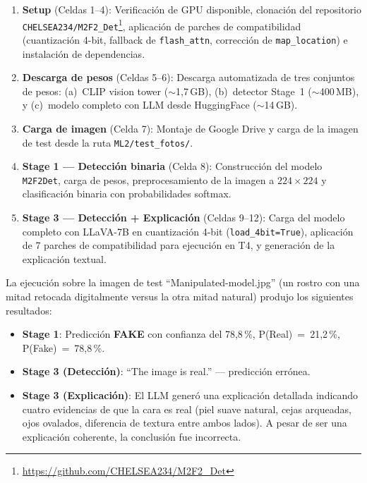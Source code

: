 \documentclass[pdflatex,sn-mathphys-num]{sn-jnl}
\begin{document}
\begin{enumerate}
    \item \textbf{Setup} (Celdas 1--4): Verificación de GPU disponible, clonación del repositorio \texttt{CHELSEA234/M2F2\_Det}\footnote{\url{https://github.com/CHELSEA234/M2F2_Det}}, aplicación de parches de compatibilidad (cuantización 4-bit, fallback de \texttt{flash\_attn}, corrección de \texttt{map\_location}) e instalación de dependencias.

    \item \textbf{Descarga de pesos} (Celdas 5--6): Descarga automatizada de tres conjuntos de pesos: (a)~CLIP vision tower ($\sim$1,7\,GB), (b)~detector Stage~1 ($\sim$400\,MB), y (c)~modelo completo con LLM desde HuggingFace ($\sim$14\,GB).

    \item \textbf{Carga de imagen} (Celda 7): Montaje de Google Drive y carga de la imagen de test desde la ruta \texttt{ML2/test\_fotos/}.

    \item \textbf{Stage 1 --- Detección binaria} (Celda 8): Construcción del modelo \texttt{M2F2Det}, carga de pesos, preprocesamiento de la imagen a $224\times224$ y clasificación binaria con probabilidades softmax.

    \item \textbf{Stage 3 --- Detección + Explicación} (Celdas 9--12): Carga del modelo completo con LLaVA-7B en cuantización 4-bit (\texttt{load\_4bit=True}), aplicación de 7 parches de compatibilidad para ejecución en T4, y generación de la explicación textual.
\end{enumerate}

La ejecución sobre la imagen de test ``Manipulated-model.jpg'' (un rostro con una mitad retocada digitalmente versus la otra mitad natural) produjo los siguientes resultados:
\begin{itemize}
    \item \textbf{Stage 1}: Predicción \textbf{FAKE} con confianza del 78,8\,\%, P(Real)~=~21,2\,\%, P(Fake)~=~78,8\,\%.
    \item \textbf{Stage 3 (Detección)}: ``The image is real.'' --- predicción errónea.
    \item \textbf{Stage 3 (Explicación)}: El LLM generó una explicación detallada indicando cuatro evidencias de que la cara es real (piel suave natural, cejas arqueadas, ojos ovalados, diferencia de textura entre ambos lados). A pesar de ser una explicación coherente, la conclusión fue incorrecta.
\end{itemize}
\end{document}
